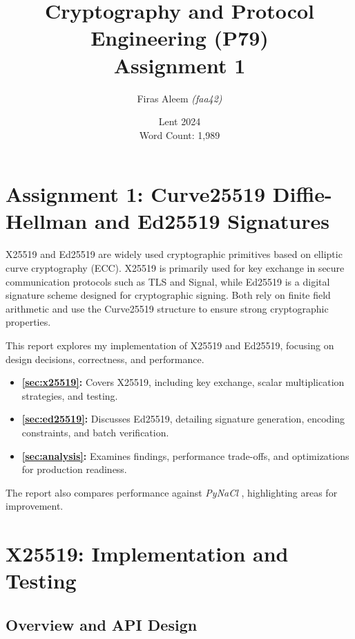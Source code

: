\documentclass[twoside,a4paper,12pt]{article}
\title{\textbf{Cryptography and Protocol Engineering (P79)\\ Assignment 1}}
\author{Firas Aleem \textsl{(faa42)}}
\date{Lent 2024 \\\vspace{0.5cm} {\small Word Count: 1,989}}
\begin{document}

\maketitle
\thispagestyle{empty}
\newpage

\newcommand{\smalltt}[1]{\texttt{\small #1}}


\section{Assignment 1: Curve25519 Diffie-Hellman and Ed25519 Signatures}
\label{sec:introduction}
X25519 and Ed25519 are widely used cryptographic primitives based on elliptic curve cryptography (ECC). X25519 is primarily used for key exchange in secure communication protocols such as TLS and Signal, while Ed25519 is a digital signature scheme designed for cryptographic signing. Both rely on finite field arithmetic and use the Curve25519 structure to ensure strong cryptographic properties.

This report explores my implementation of {X25519 and Ed25519}, focusing on {design decisions, correctness, and performance}. 

\begin{itemize}
    \item \textbf{\autoref{sec:x25519}:} Covers {X25519}, including key exchange, scalar multiplication strategies, and testing.
    \item \textbf{\autoref{sec:ed25519}:} Discusses {Ed25519}, detailing signature generation, encoding constraints, and batch verification.
    \item \textbf{\autoref{sec:analysis}:} Examines findings, performance trade-offs, and optimizations for production readiness.
\end{itemize}

The report also compares performance against \textit{PyNaCl} \cite{PyNaCl}, highlighting areas for improvement.

\section{X25519: Implementation and Testing}
\label{sec:x25519}

\subsection{Overview and API Design}
\end{document}
